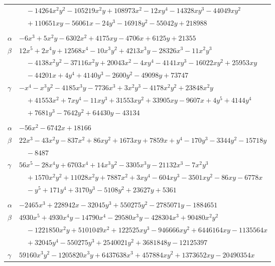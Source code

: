 \documentclass[11pt]{article}
\begin{document}
\begin{longtable}{@{}ll@{}}
 & $\quad -14264x^{2}y^{2}-105219x^{2}y+108973x^{2}-12xy^{4}-14328xy^{3}-44049xy^{2}$\\
 & $\quad +110651xy-56061x-24y^{3}-16918y^{2}-55042y+218988$\\
\addlinespace[3pt]
\multicolumn{2}{@{}l}{$\{i,j\}=\{15,47\}$, $k_{ij}=2^{2}\cdot 3^{2}\cdot 7\cdot 31^{2}$}\\
$\alpha$ & $-6x^{3}+5x^{2}y-6302x^{2}+4175xy-4706x+6125y+21355$\\
$\beta$ & $12x^{5}+2x^{4}y+12568x^{4}-10x^{3}y^{2}+4213x^{3}y-28326x^{3}-11x^{2}y^{3}$\\
 & $\quad -4138x^{2}y^{2}-37116x^{2}y+20043x^{2}-4xy^{4}-4141xy^{3}-16022xy^{2}+25953xy$\\
 & $\quad -44201x+4y^{4}+4140y^{3}-2600y^{2}-49098y+73747$\\
$\gamma$ & $-x^{4}-x^{3}y^{2}-4185x^{3}y-7736x^{3}+3x^{2}y^{3}-4178x^{2}y^{2}+23848x^{2}y$\\
 & $\quad +41553x^{2}+7xy^{4}-11xy^{3}+31553xy^{2}+33905xy-9607x+4y^{5}+4144y^{4}$\\
 & $\quad +7681y^{3}-7642y^{2}+64430y-43134$\\
\addlinespace[3pt]
\multicolumn{2}{@{}l}{$\{i,j\}=\{15,48\}$, $k_{ij}=2\cdot 3^{3}\cdot 7^{2}\cdot 13$}\\
$\alpha$ & $-56x^{2}-6742x+18166$\\
$\beta$ & $22x^{3}-43x^{2}y-837x^{2}+86xy^{2}+1673xy+7859x+y^{4}-170y^{3}-3344y^{2}-15718y$\\
 & $\quad -8487$\\
$\gamma$ & $56x^{5}-28x^{4}y+6703x^{4}+14x^{3}y^{2}-3305x^{3}y-21132x^{3}-7x^{2}y^{3}$\\
 & $\quad +1570x^{2}y^{2}+11028x^{2}y+7887x^{2}+3xy^{4}-604xy^{3}-3501xy^{2}-86xy-6778x$\\
 & $\quad -y^{5}+171y^{4}+3170y^{3}-5108y^{2}+23627y+5361$\\
\addlinespace[3pt]
\multicolumn{2}{@{}l}{$\{i,j\}=\{15,64\}$, $k_{ij}=2^{5}\cdot 3^{4}\cdot 13\cdot 31^{2}$}\\
$\alpha$ & $-2465x^{3}+228942x-32045y^{3}+550275y^{2}-2785071y-1884651$\\
$\beta$ & $4930x^{5}+4930x^{4}y-14790x^{4}-29580x^{3}y-428304x^{3}+90480x^{2}y^{2}$\\
 & $\quad -1221850x^{2}y+5101049x^{2}+122525xy^{3}-946666xy^{2}+6446164xy-1135564x$\\
 & $\quad +32045y^{4}-550275y^{3}+2540021y^{2}+3681848y-12125397$\\
$\gamma$ & $59160x^{3}y^{2}-1205820x^{3}y+6437638x^{3}+457884xy^{2}+1373652xy-20490354x$\\

\end{longtable}
\end{document}
